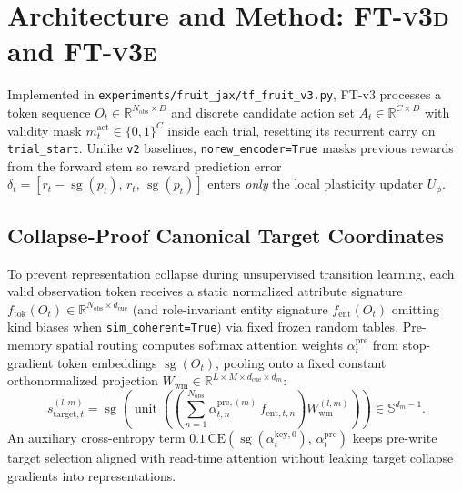 \documentclass[11pt]{article}
\newcommand{\unit}[1]{\operatorname{unit}\!\left(#1\right)}
\newcommand{\sg}{\operatorname{sg}}
\newcommand{\Uphi}{U_\phi}
\newcommand{\ftd}{\textsc{FT-v3d}}
\newcommand{\fte}{\textsc{FT-v3e}}
\begin{document}
\section{Architecture and Method: \ftd{} and \fte{}}
\label{sec:method}

Implemented in \texttt{experiments/fruit\_jax/tf\_fruit\_v3.py}, FT-v3 processes a token sequence $O_t \in \mathbb{R}^{N_{\text{obs}} \times D}$ and discrete candidate action set $A_t \in \mathbb{R}^{C \times D}$ with validity mask $m^{\text{act}}_t \in \{0,1\}^C$ inside each trial, resetting its recurrent carry on \texttt{trial\_start}. Unlike \texttt{v2} baselines, \texttt{norew\_encoder=True} masks previous rewards from the forward stem so reward prediction error $\delta_t = [r_t - \sg(p_t),\, r_t,\, \sg(p_t)]$ enters \emph{only} the local plasticity updater $\Uphi$.

\subsection{Collapse-Proof Canonical Target Coordinates}
To prevent representation collapse during unsupervised transition learning, each valid observation token receives a static normalized attribute signature $f_{\text{tok}}(O_t) \in \mathbb{R}^{N_{\text{obs}} \times d_{\text{cue}}}$ (and role-invariant entity signature $f_{\text{ent}}(O_t)$ omitting kind biases when \texttt{sim\_coherent=True}) via fixed frozen random tables. Pre-memory spatial routing computes softmax attention weights $\alpha^{\text{pre}}_t$ from stop-gradient token embeddings $\sg(O_t)$, pooling onto a fixed constant orthonormalized projection $W_{\text{wm}} \in \mathbb{R}^{L \times M \times d_{\text{cue}} \times d_m}$:
\begin{equation}
s_{\text{target}, t}^{(l,m)} = \sg\left(\unit{\left(\sum_{n=1}^{N_{\text{obs}}} \alpha^{\text{pre},(m)}_{t,n}\, f_{\text{ent}, t, n}\right) W_{\text{wm}}^{(l,m)}}\right) \in \mathbb{S}^{d_m - 1}.
\label{eq:starget}
\end{equation}
An auxiliary cross-entropy term $0.1\,\mathrm{CE}(\sg(\alpha^{\text{key}, 0}_t),\, \alpha^{\text{pre}}_t)$ keeps pre-write target selection aligned with read-time attention without leaking target collapse gradients into representations.
\end{document}
